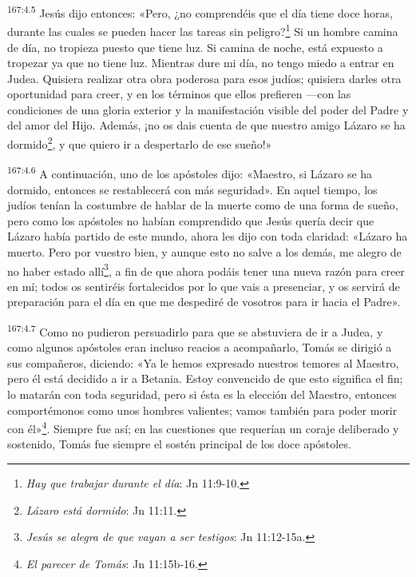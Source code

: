 \par 
\textsuperscript{167:4.5} Jesús dijo entonces: «Pero, ¿no comprendéis que el día tiene doce horas, durante las cuales se pueden hacer las tareas sin peligro?\footnote{\textit{Hay que trabajar durante el día}: Jn 11:9-10.} Si un hombre camina de día, no tropieza puesto que tiene luz. Si camina de noche, está expuesto a tropezar ya que no tiene luz. Mientras dure mi día, no tengo miedo a entrar en Judea. Quisiera realizar otra obra poderosa para esos judíos; quisiera darles otra oportunidad para creer, y en los términos que ellos prefieren ---con las condiciones de una gloria exterior y la manifestación visible del poder del Padre y del amor del Hijo. Además, ¡no os dais cuenta de que nuestro amigo Lázaro se ha dormido\footnote{\textit{Lázaro está dormido}: Jn 11:11.}, y que quiero ir a despertarlo de ese sueño!»

\par 
\textsuperscript{167:4.6} A continuación, uno de los apóstoles dijo: «Maestro, si Lázaro se ha dormido, entonces se restablecerá con más seguridad». En aquel tiempo, los judíos tenían la costumbre de hablar de la muerte como de una forma de sueño, pero como los apóstoles no habían comprendido que Jesús quería decir que Lázaro había partido de este mundo, ahora les dijo con toda claridad: «Lázaro ha muerto. Pero por vuestro bien, y aunque esto no salve a los demás, me alegro de no haber estado allí\footnote{\textit{Jesús se alegra de que vayan a ser testigos}: Jn 11:12-15a.}, a fin de que ahora podáis tener una nueva razón para creer en mí; todos os sentiréis fortalecidos por lo que vais a presenciar, y os servirá de preparación para el día en que me despediré de vosotros para ir hacia el Padre».

\par 
\textsuperscript{167:4.7} Como no pudieron persuadirlo para que se abstuviera de ir a Judea, y como algunos apóstoles eran incluso reacios a acompañarlo, Tomás se dirigió a sus compañeros, diciendo: «Ya le hemos expresado nuestros temores al Maestro, pero él está decidido a ir a Betania. Estoy convencido de que esto significa el fin; lo matarán con toda seguridad, pero si ésta es la elección del Maestro, entonces comportémonos como unos hombres valientes; vamos también para poder morir con él»\footnote{\textit{El parecer de Tomás}: Jn 11:15b-16.}. Siempre fue así; en las cuestiones que requerían un coraje deliberado y sostenido, Tomás fue siempre el sostén principal de los doce apóstoles.

